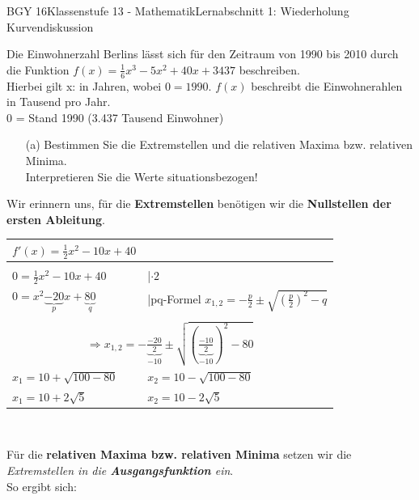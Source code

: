 \documentclass[oneside,openany,headings=optiontotoc,11pt,numbers=noenddot]{scrreprt}
\begin{document}
	\begin{worksheet}{BGY 16}{Klassenstufe 13 - Mathematik}{Lernabschnitt 1: Wiederholung Kurvendiskussion}
				
		\noindent
		\begin{framed}
			\noindent
			Die Einwohnerzahl Berlins lässt sich für den Zeitraum von 1990 bis 2010 durch die Funktion \(f(x) = \frac{1}{6}x^3 - 5x^2 +40x +3437\) beschreiben.\\
			Hierbei gilt x: in Jahren, wobei \(0 = 1990\). \(f(x)\) beschreibt die Einwohnerahlen in Tausend pro Jahr.\\
			0 = Stand 1990 (3.437 Tausend Einwohner)
		\end{framed}
		\begin{itemize}
			\item[(a)] Bestimmen Sie die Extremstellen und die relativen Maxima bzw. relativen Minima.\\
			Interpretieren Sie die Werte situationsbezogen!
		\end{itemize}
		\begin{framed}
			Wir erinnern uns, für die \textbf{Extremstellen} benötigen wir die \textbf{Nullstellen der ersten Ableitung}.\\
			\begin{tabularx}{\textwidth}{Xl}
				\(f'(x) = \frac{1}{2}x^2 -10x +40\)\\
				\hline
				\\
				\(0 = \frac{1}{2}x^2 -10x +40\) & |\(\cdot{}2\)\\
				\(0 = x^2 \underbrace{-20}_{p}x +\underbrace{80}_{q}\) & |pq-Formel \colorbox{green!10}{\(x_{1,2} = -\frac{p}{2}\pm\sqrt{\left(\frac{p}{2}\right)^2 -q}\)}\\\\
				\multicolumn{2}{c}{\(\Rightarrow x_{1,2} = -\underbrace{\frac{-20}{2}}_{-10}\pm\sqrt{\left(\underbrace{\frac{-10}{2}}_{-10}\right)^2 -80}\)}\\
				\(x_1= 10 + \sqrt{100-80} \) & \(x_2= 10 - \sqrt{100-80}\)\\
				\colorbox{green!10}{\(x_1 = 10 + 2\sqrt{5}\)} & \colorbox{green!10}{\(x_2 = 10 - 2\sqrt{5}\)}
			\end{tabularx}\\
			\par\noindent
			Für die \textbf{relativen Maxima bzw. relativen Minima} setzen wir die \textit{Extremstellen in die \textbf{Ausgangsfunktion} ein}.\\
			So ergibt sich:\\

\end{framed}
\end{worksheet}
\end{document}
